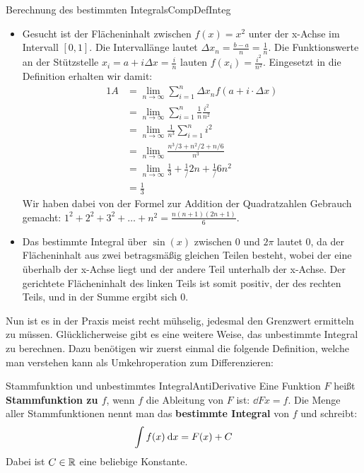 \begin{example}{Berechnung des bestimmten Integrals}{CompDefInteg}
    \begin{itemize}
        \item Gesucht ist der Flächeninhalt zwischen $f(x) = x^2$ unter der x-Achse im Intervall $[0,1]$. Die Intervallänge lautet $\Delta x_n = \frac{b-a}{n} = \frac{1}{n}$. Die Funktionswerte an der Stützstelle $x_i = a + i \Delta x = \frac{i}{n}$ lauten $f(x_i) = \frac{i^2}{n^2}$. Eingesetzt in die Definition erhalten wir damit:
        \begin{alignat*}{1}
            A &= \lim\limits_{n\to\infty} \sum_{i=1}^{n} \Delta x_n f(a + i\cdot\Delta x) \\
              &= \lim\limits_{n\to\infty} \sum_{i=1}^{n} \frac{1}{n} \frac{i^2}{n^2} \\
              &= \lim\limits_{n\to\infty} \frac{1}{n^3} \sum_{i=1}^{n} i^2 \\
              &= \lim\limits_{n\to\infty} \frac{n^3/3+n^2/2+n/6}{n^3} \\
              &= \lim\limits_{n\to\infty} \frac{1}{3} + \frac{1}/{2n} + \frac{1}/{6n^2} \\
              &= \frac{1}{3}
        \end{alignat*}
        Wir haben dabei von der Formel zur Addition der Quadratzahlen Gebrauch gemacht: $1^2 + 2^2 + 3^2 + \dots + n^2 = \frac{n (n+1) (2n+1)}{6}$.
        \item Das bestimmte Integral über $\sin(x)$ zwischen $0$ und $2\pi$ lautet $0$, da der Flächeninhalt aus zwei betragsmäßig gleichen Teilen besteht, wobei der eine überhalb der x-Achse liegt und der andere Teil unterhalb der x-Achse. Der gerichtete Flächeninhalt des linken Teils ist somit positiv, der des rechten Teils, und in der Summe ergibt sich $0$.
    \end{itemize}
\end{example}

Nun ist es in der Praxis meist recht mühselig, jedesmal den Grenzwert ermitteln zu müssen. Glücklicherweise gibt es eine weitere Weise, das unbestimmte Integral zu berechnen. Dazu benötigen wir zuerst einmal die folgende Definition, welche man verstehen kann als Umkehroperation zum Differenzieren:

\begin{definition}{Stammfunktion und unbestimmtes Integral}{AntiDerivative}
    Eine Funktion $F$ heißt \textbf{Stammfunktion zu $f$}, wenn $f$ die Ableitung von $F$ ist: $\dd{F}{x} = f$. Die Menge aller Stammfunktionen nennt man das \textbf{bestimmte Integral} von $f$ und schreibt:
    $$
        \int f(x) \:\mathrm{d}{x} = F(x) + C
    $$
    Dabei ist $C \in \mathbb{R}$ eine beliebige Konstante.
\end{definition}


